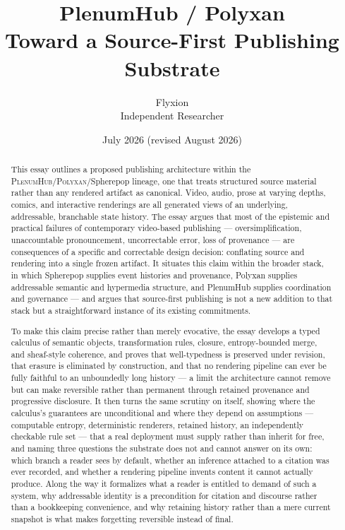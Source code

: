 \documentclass[11pt]{article}
\title{\textbf{PlenumHub / Polyxan}\\
\large Toward a Source-First Publishing Substrate}
\author{Flyxion\\\small Independent Researcher}
\date{July 2026 (revised August 2026)}
\theoremstyle{definition}
\begin{document}
\maketitle

\begin{abstract}
\noindent This essay outlines a proposed publishing architecture within the \textsc{PlenumHub}\slash\textsc{Polyxan}\slash Spherepop lineage, one that treats structured source material rather than any rendered artifact as canonical. Video, audio, prose at varying depths, comics, and interactive renderings are all generated views of an underlying, addressable, branchable state history. The essay argues that most of the epistemic and practical failures of contemporary video-based publishing --- oversimplification, unaccountable pronouncement, uncorrectable error, loss of provenance --- are consequences of a specific and correctable design decision: conflating source and rendering into a single frozen artifact. It situates this claim within the broader stack, in which Spherepop supplies event histories and provenance, Polyxan supplies addressable semantic and hypermedia structure, and PlenumHub supplies coordination and governance --- and argues that source-first publishing is not a new addition to that stack but a straightforward instance of its existing commitments.

To make this claim precise rather than merely evocative, the essay develops a typed calculus of semantic objects, transformation rules, closure, entropy-bounded merge, and sheaf-style coherence, and proves that well-typedness is preserved under revision, that erasure is eliminated by construction, and that no rendering pipeline can ever be fully faithful to an unboundedly long history --- a limit the architecture cannot remove but can make reversible rather than permanent through retained provenance and progressive disclosure. It then turns the same scrutiny on itself, showing where the calculus's guarantees are unconditional and where they depend on assumptions --- computable entropy, deterministic renderers, retained history, an independently checkable rule set --- that a real deployment must supply rather than inherit for free, and naming three questions the substrate does not and cannot answer on its own: which branch a reader sees by default, whether an inference attached to a citation was ever recorded, and whether a rendering pipeline invents content it cannot actually produce. Along the way it formalizes what a reader is entitled to demand of such a system, why addressable identity is a precondition for citation and discourse rather than a bookkeeping convenience, and why retaining history rather than a mere current snapshot is what makes forgetting reversible instead of final.


\end{abstract}
\end{document}

